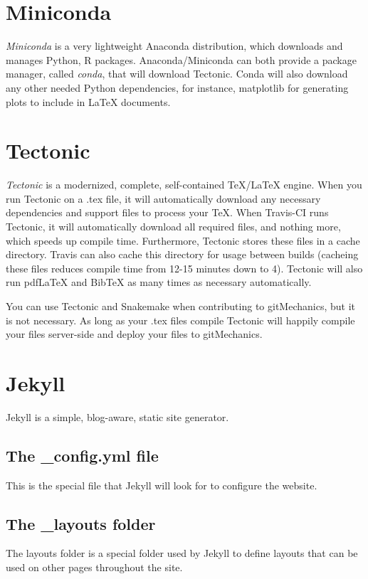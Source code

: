 \documentclass[landscape, twocolumn, 12pt]{article}
\begin{document}
\section{Miniconda}
\textit{Miniconda} is a very lightweight Anaconda distribution, which downloads and manages Python, R packages. Anaconda/Miniconda can both provide a package manager, called \textit{conda}, that will download Tectonic. Conda will also download any other needed Python dependencies, for instance, matplotlib for generating plots to include in \LaTeX{} documents.

\section{Tectonic}
\textit{Tectonic} is a modernized, complete, self-contained \TeX{}/\LaTeX{} engine. When you run Tectonic on a .tex file, it will automatically download any necessary dependencies and support files to process your \TeX{}. When Travis-CI runs Tectonic, it will automatically download all required files, and nothing more, which speeds up compile time. Furthermore, Tectonic stores these files in a cache directory. Travis can also cache this directory for usage between builds (cacheing these files reduces compile time from 12-15 minutes down to 4). Tectonic will also run pdfLaTeX and BibTeX as many times as necessary automatically.

You can use Tectonic and Snakemake when contributing to gitMechanics, but it is not necessary. As long as your .tex files compile Tectonic will happily compile your files server-side and deploy your files to gitMechanics.

\section{Jekyll}
Jekyll is a simple, blog-aware, static site generator.

\subsection{The \_config.yml file}
This is the special file that Jekyll will look for to configure the website.

\subsection{The \_layouts folder}
The layouts folder is a special folder used by Jekyll to define layouts that can be used on other pages throughout the site. 
\end{document}
